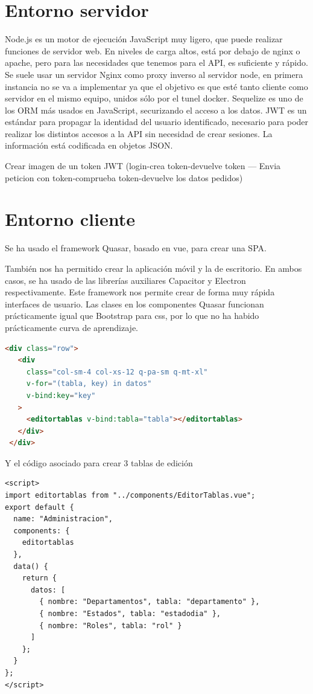 \documentclass[11pt,spanish,listoffigures,listoftables]{tfgetsinf}
\begin{document}
\section{Entorno servidor}
Node.js es un motor de ejecución JavaScript muy ligero, que puede realizar funciones de servidor web. 
En niveles de carga altos, está por debajo de nginx o apache, pero para las necesidades que tenemos para el API, es suficiente y rápido.
Se suele usar un servidor Nginx como proxy inverso al servidor node, en primera instancia no se va a implementar ya que el objetivo es que esté tanto cliente como servidor en el mismo equipo, unidos sólo por el tunel docker.
Sequelize es uno de los ORM más usados en JavaScript, securizando el acceso a los datos. 
JWT es un estándar para propagar la identidad del usuario identificado, necesario para poder realizar los distintos accesos a la API sin necesidad de crear sesiones.
La información está codificada en objetos JSON. 

Crear imagen de un token JWT (login-crea token-devuelve token --- Envia peticion con token-comprueba token-devuelve los datos pedidos)

\section{Entorno cliente}

Se ha usado el framework Quasar, basado en vue, para crear una SPA. 

También nos ha permitido crear la aplicación móvil y la de escritorio. En ambos casos, se ha usado de las librerías auxiliares Capacitor y Electron respectivamente.
Este framework nos permite crear de forma muy rápida interfaces de usuario. 
Las clases en los componentes Quasar funcionan prácticamente igual que Bootstrap para css, por lo que no ha habido prácticamente curva de aprendizaje.
\begin{lstlisting}[language=HTML]
   <div class="row">
   <div
     class="col-sm-4 col-xs-12 q-pa-sm q-mt-xl"
     v-for="(tabla, key) in datos"
     v-bind:key="key"
   >
     <editortablas v-bind:tabla="tabla"></editortablas>
   </div>
 </div>
\end{lstlisting}

Y el código asociado para crear 3 tablas de edición 

\begin{lstlisting}
<script>
import editortablas from "../components/EditorTablas.vue";
export default {
  name: "Administracion",
  components: {
    editortablas
  },
  data() {
    return {
      datos: [
        { nombre: "Departamentos", tabla: "departamento" },
        { nombre: "Estados", tabla: "estadodia" },
        { nombre: "Roles", tabla: "rol" }
      ]
    };
  }
};
</script>
\end{lstlisting}
\end{document}
